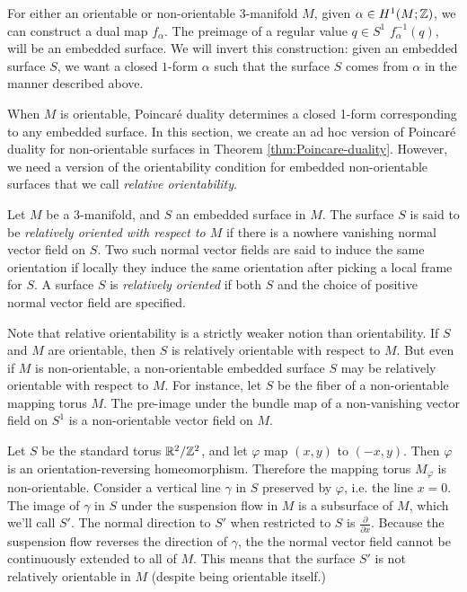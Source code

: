 For either an orientable or non-orientable 3-manifold $M$, given $\alpha\in H^1(M; \mathbb{Z})$, we can construct a dual map $f_\alpha$.  The preimage of a regular value $q\in S^1$ $f_{\alpha}^{-1}(q)$, will be an embedded surface. %
We will invert this construction: given an embedded surface $S$, we want a
closed $1$-form $\alpha$ such that the surface $S$ comes from $\alpha$ in the manner described
above.

When $M$ is orientable, Poincar\'e duality determines a closed 1-form corresponding to any embedded surface.  In this section, we create an ad hoc version of Poincar\'e duality for non-orientable surfaces in Theorem \ref{thm:Poincare-duality}.
However, we need a version of the orientability condition for embedded non-orientable surfaces that we call \emph{relative orientability}.

  Let $M$ be a $3$-manifold, and $S$ an embedded surface in $M$. The surface $S$ is said to be {\it relatively
  oriented with respect to $M$} if there is a nowhere vanishing normal vector field on $S$. Two
  such normal vector fields are said to induce the same orientation if locally they induce the
  same orientation after picking a local frame for $S$. A surface $S$ is \emph{relatively oriented}
  if both $S$ and the choice of positive normal vector field are specified.

Note that relative orientability is a strictly weaker notion than orientability. If $S$ and $M$ are
orientable, then $S$ is relatively orientable with respect to $M$. But even if $M$ is
non-orientable, a non-orientable embedded surface $S$ may be relatively orientable with respect to $M$. For instance, let $S$ be
the fiber of a non-orientable mapping torus $M$.  The pre-image under the bundle map of a non-vanishing vector field on $S^1$ is a non-orientable vector field on $M$.

  Let $S$ be the standard torus $\mathbb{R}^2/\mathbb{Z}^2$, and let $\varphi$ map $(x,y)$ to $(-x, y)$. Then $\varphi$ is an
  orientation-reversing homeomorphism.  Therefore the mapping torus $M_\varphi$ is non-orientable. Consider a vertical line $\gamma$ in $S$ preserved by $\varphi$, i.e. the line
  $x = 0$. The image of $\gamma$ in $S$ under the suspension flow in $M$ is a subsurface of $M$,
  which we'll call $S'$. The normal direction to $S'$ when restricted to $S$ is $\frac{\partial}{\partial x}$. Because the suspension flow reverses the direction of $\gamma$, the 
  the normal vector field cannot be continuously extended to all of $M$.
  This means that the surface $S'$ is not relatively orientable in $M$ (despite being orientable itself.)

